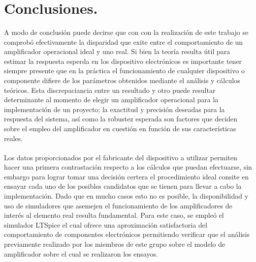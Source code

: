 \newpage

\section{Conclusiones.}
\paragraph{}
A modo de conclusión puede decirse que con con la realización de este trabajo se comprobó efectivamente la disparidad que exite entre el comportamiento de un amplificador operacional ideal y uno real. Si bien la teoría resulta útil para estimar la respuesta esperda en los dispositivo electrónicos es importante tener siempre presente que en la práctica el funcionamiento de cualquier dispositivo o componente difiere de los parámetros obtenidos mediante el análisis y cálculos teóricos. Esta discrepaciancia entre un resultado y otro puede resultar determinante al momento de elegir un amplificador operacional para la implementación de un proyecto; la exactitud y precisión deseadas para la respuesta del sistema, así como la robustez esperada son factores que deciden sobre el empleo del amplificador en cuestión en función de sus características reales.
\paragraph{}
Los datos proporcionados por el fabricante del dispositivo a utilizar permiten hacer una primera contrastación respecto a los cálculos que puedan efectuarse, sin embargo para lograr tomar una decisión certera el procedimiento ideal consite en ensayar cada uno de los posibles candidatos que se tienen para llevar a cabo la implementación. Dado que en mucho casos esto no es posible, la disponibilidad y uso de simuladores que asemejen el funcionamiento de los amplificadores de interés al elemento real resulta fundamental. Para este caso, se empleó el simulador LTSpice el cual ofrece una aproximación satisfactoria del comportamiento de componentes electrónicos permitiendo verificar que el análisis previamente realizado por los miembros de este grupo sobre el modelo de amplificador sobre el cual se realizaron los ensayos.
